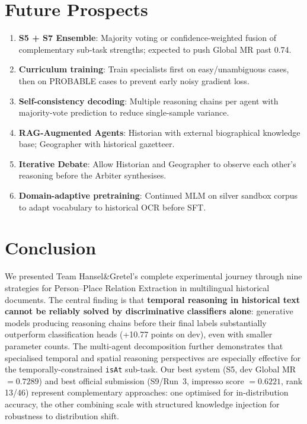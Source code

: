 \documentclass{ceurart}
\begin{document}
\section{Future Prospects}
\label{sec:future}

\begin{enumerate}
  \item \textbf{S5 + S7 Ensemble}: Majority voting or confidence-weighted fusion of complementary sub-task strengths; expected to push Global MR past 0.74.
  \item \textbf{Curriculum training}: Train specialists first on easy/unambiguous cases, then on PROBABLE cases to prevent early noisy gradient loss.
  \item \textbf{Self-consistency decoding}: Multiple reasoning chains per agent with majority-vote prediction to reduce single-sample variance.
  \item \textbf{RAG-Augmented Agents}: Historian with external biographical knowledge base; Geographer with historical gazetteer.
  \item \textbf{Iterative Debate}: Allow Historian and Geographer to observe each other's reasoning before the Arbiter synthesises.
  \item \textbf{Domain-adaptive pretraining}: Continued MLM on silver sandbox corpus to adapt vocabulary to historical OCR before SFT.
\end{enumerate}

\section{Conclusion}
\label{sec:conclusion}

We presented Team Hansel\&Gretel's complete experimental journey through nine strategies for Person--Place Relation Extraction in multilingual historical documents. The central finding is that \textbf{temporal reasoning in historical text cannot be reliably solved by discriminative classifiers alone}: generative models producing reasoning chains before their final labels substantially outperform classification heads (+10.77 points on dev), even with smaller parameter counts. The multi-agent decomposition further demonstrates that specialised temporal and spatial reasoning perspectives are especially effective for the temporally-constrained \texttt{isAt} sub-task. Our best system (S5, dev Global MR $= 0.7289$) and best official submission (S9/Run~3, impresso score $= 0.6221$, rank 13/46) represent complementary approaches: one optimised for in-distribution accuracy, the other combining scale with structured knowledge injection for robustness to distribution shift.
\end{document}
